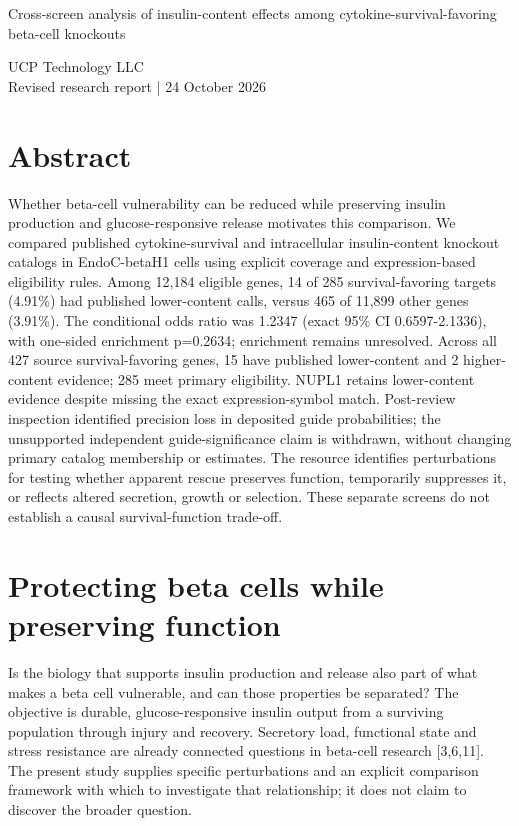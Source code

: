 \documentclass[10pt,letterpaper]{article}
\begin{document}
{\LARGE\bfseries\raggedright Cross-screen analysis of insulin-content effects among cytokine-survival-favoring beta-cell knockouts\par}
{\large UCP Technology LLC\\Revised research report | 24 October 2026\par}
\section*{Abstract}
Whether beta-cell vulnerability can be reduced while preserving insulin production and glucose-responsive release motivates this comparison. We compared published cytokine-survival and intracellular insulin-content knockout catalogs in EndoC-betaH1 cells using explicit coverage and expression-based eligibility rules. Among 12,184 eligible genes, 14 of 285 survival-favoring targets (4.91\%) had published lower-content calls, versus 465 of 11,899 other genes (3.91\%). The conditional odds ratio was 1.2347 (exact 95\% CI 0.6597-2.1336), with one-sided enrichment p=0.2634; enrichment remains unresolved. Across all 427 source survival-favoring genes, 15 have published lower-content and 2 higher-content evidence; 285 meet primary eligibility. NUPL1 retains lower-content evidence despite missing the exact expression-symbol match. Post-review inspection identified precision loss in deposited guide probabilities; the unsupported independent guide-significance claim is withdrawn, without changing primary catalog membership or estimates. The resource identifies perturbations for testing whether apparent rescue preserves function, temporarily suppresses it, or reflects altered secretion, growth or selection. These separate screens do not establish a causal survival-function trade-off.

\section*{Protecting beta cells while preserving function}
Is the biology that supports insulin production and release also part of what makes a beta cell vulnerable, and can those properties be separated? The objective is durable, glucose-responsive insulin output from a surviving population through injury and recovery. Secretory load, functional state and stress resistance are already connected questions in beta-cell research [3,6,11]. The present study supplies specific perturbations and an explicit comparison framework with which to investigate that relationship; it does not claim to discover the broader question.
\end{document}
